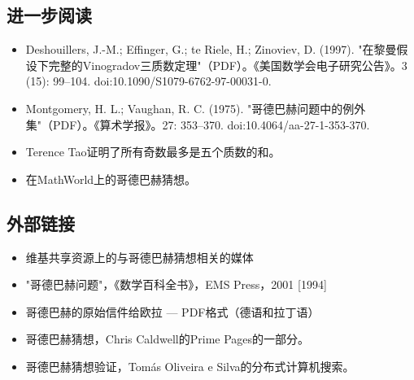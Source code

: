 \subsection{进一步阅读}  
\begin{itemize}
\item Deshouillers, J.-M.; Effinger, G.; te Riele, H.; Zinoviev, D. (1997). "在黎曼假设下完整的Vinogradov三质数定理"（PDF）。《美国数学会电子研究公告》。3 (15): 99–104. doi:10.1090/S1079-6762-97-00031-0.  
\item Montgomery, H. L.; Vaughan, R. C. (1975). "哥德巴赫问题中的例外集"（PDF）。《算术学报》。27: 353–370. doi:10.4064/aa-27-1-353-370.  
\item Terence Tao证明了所有奇数最多是五个质数的和。  
\item 在MathWorld上的哥德巴赫猜想。 
\end{itemize} 
\subsection{外部链接}  
\begin{itemize}
\item 维基共享资源上的与哥德巴赫猜想相关的媒体  
\item "哥德巴赫问题"，《数学百科全书》，EMS Press，2001 [1994]  
\item 哥德巴赫的原始信件给欧拉 — PDF格式（德语和拉丁语）  
\item 哥德巴赫猜想，Chris Caldwell的Prime Pages的一部分。  
\item 哥德巴赫猜想验证，Tomás Oliveira e Silva的分布式计算机搜索。
\end{itemize}